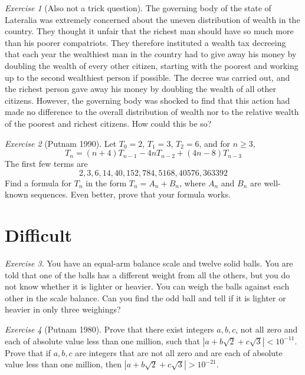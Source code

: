 \documentclass{article}
\theoremstyle{definition}
\theoremstyle{remark}
\newtheorem{exercise}{Exercise}
\begin{document}
\begin{exercise}[Also not a trick question]
The governing body of the state of Lateralia was extremely concerned about the uneven distribution of wealth in the country. They thought it unfair that the richest man should have so much more than his poorer compatriots. They therefore instituted a wealth tax decreeing that each year the wealthiest man in the country had to give away his money by doubling the wealth of every other citizen, starting with the poorest and working up to the second wealthiest person if possible. The decree was carried out, and the richest person gave away his money by doubling the wealth of all other citizens. However, the governing body was shocked to find that this action had made no difference to the overall distribution of wealth nor to the relative wealth of the poorest and richest citizens. How could this be so?
\end{exercise}

\begin{exercise}[Putnam 1990]
Let $T_0=2$, $T_1=3$, $T_2=6$, and for $n\geq 3$, 
\[T_n=(n+4)T_{n-1}-4nT_{n-2}+(4n-8)T_{n-3}\] The first few terms are
\[2,3,6,14,40,152,784,5168,40576,363392 \] Find a formula for $T_n$ in the form $T_n=A_n+B_n$, where $A_n$ and $B_n$ are well-known sequences. Even better, prove that your formula works.
\end{exercise}

\section{Difficult}

\begin{exercise}
You have an equal-arm balance scale and twelve solid balls. You are told that one of the balls has a different weight from all the others, but you do not know whether it is lighter or heavier. You can weigh the balls against each other in the scale balance. Can you find the odd ball and tell if it is lighter or heavier in only three weighings?
\end{exercise}

\begin{exercise}[Putnam 1980]
Prove that there exist integers $a,b,c$, not all zero and each of absolute value less than one million, such that $|a+b\sqrt{2}+c\sqrt{3}|<10^{-11}$. Prove that if $a,b,c$ are integers that are not all zero and are each of absolute value less than one million, then $|a+b\sqrt{2}+c\sqrt{3}|>10^{-21}$.
\end{exercise}
\end{document}
